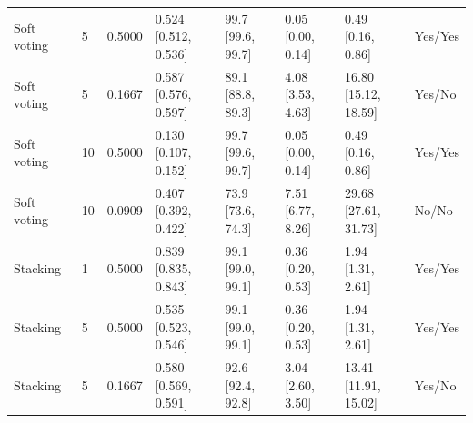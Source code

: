 \begin{longtable}{llllllll}
Soft voting & 5 & 0.5000 & \shortstack{{0.524} \\ {[0.512, 0.536]}} & \shortstack{{99.7} \\ {[99.6, 99.7]}} & \shortstack{{0.05} \\ {[0.00, 0.14]}} & \shortstack{{0.49} \\ {[0.16, 0.86]}} & Yes/Yes \\
Soft voting & 5 & 0.1667 & \shortstack{{0.587} \\ {[0.576, 0.597]}} & \shortstack{{89.1} \\ {[88.8, 89.3]}} & \shortstack{{4.08} \\ {[3.53, 4.63]}} & \shortstack{{16.80} \\ {[15.12, 18.59]}} & Yes/No \\
Soft voting & 10 & 0.5000 & \shortstack{{0.130} \\ {[0.107, 0.152]}} & \shortstack{{99.7} \\ {[99.6, 99.7]}} & \shortstack{{0.05} \\ {[0.00, 0.14]}} & \shortstack{{0.49} \\ {[0.16, 0.86]}} & Yes/Yes \\
Soft voting & 10 & 0.0909 & \shortstack{{0.407} \\ {[0.392, 0.422]}} & \shortstack{{73.9} \\ {[73.6, 74.3]}} & \shortstack{{7.51} \\ {[6.77, 8.26]}} & \shortstack{{29.68} \\ {[27.61, 31.73]}} & No/No \\
Stacking & 1 & 0.5000 & \shortstack{{0.839} \\ {[0.835, 0.843]}} & \shortstack{{99.1} \\ {[99.0, 99.1]}} & \shortstack{{0.36} \\ {[0.20, 0.53]}} & \shortstack{{1.94} \\ {[1.31, 2.61]}} & Yes/Yes \\
Stacking & 5 & 0.5000 & \shortstack{{0.535} \\ {[0.523, 0.546]}} & \shortstack{{99.1} \\ {[99.0, 99.1]}} & \shortstack{{0.36} \\ {[0.20, 0.53]}} & \shortstack{{1.94} \\ {[1.31, 2.61]}} & Yes/Yes \\
Stacking & 5 & 0.1667 & \shortstack{{0.580} \\ {[0.569, 0.591]}} & \shortstack{{92.6} \\ {[92.4, 92.8]}} & \shortstack{{3.04} \\ {[2.60, 3.50]}} & \shortstack{{13.41} \\ {[11.91, 15.02]}} & Yes/No \\

\end{longtable}
